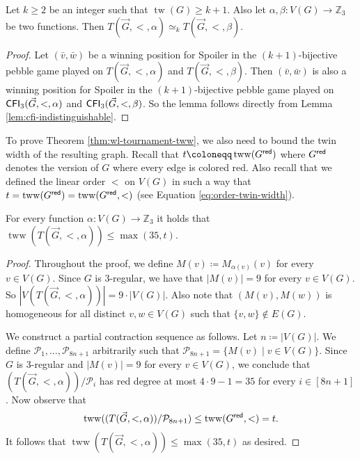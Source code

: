 \documentclass{theoretics}
\newcommand{\CP}{{\mathcal P}}
\newcommand{\ZZ}{{\mathbb Z}}
\newcommand{\red}{{\sf red}}
\DeclareMathOperator{\tw}{tw}
\DeclareMathOperator{\tww}{tww}
\newcommand{\CFI}{{\sf CFI}}
\begin{document}
\begin{lemma}
 \label{lem:cfi-tournament-indistinguishable}
 Let $k \geq 2$ be an integer such that $\tw(G) \geq k+1$.
 Also let $\alpha,\beta\colon V(G) \to \ZZ_3$ be two functions.
 Then $T(\vec{G},<,\alpha) \simeq_k T(\vec{G},<,\beta)$.
\end{lemma}

\begin{proof}
 Let $(\bar v,\bar w)$ be a winning position for Spoiler in the $(k+1)$-bijective pebble game played on $T(\vec{G},<,\alpha)$ and $T(\vec{G},<,\beta)$.
 Then $(\bar v,\bar w)$ is also a winning position for Spoiler in the $(k+1)$-bijective pebble game played on $\CFI_3(\vec{G},<,\alpha)$ and $\CFI_3(\vec{G},<,\beta)$.
 So the lemma follows directly from Lemma \ref{lem:cfi-indistinguishable}.
\end{proof}

To prove Theorem \ref{thm:wl-tournament-tww}, we also need to bound the twin width of the resulting graph.
Recall that $t \coloneqq \tww(G^{\red})$ where $G^{\red}$ denotes the version of $G$ where every edge is colored red.
Also recall that we defined the linear order $<$ on $V(G)$ in such a way that $t = \tww(G^{\red}) = \tww(G^{\red},<)$ (see Equation \eqref{eq:order-twin-width}).

\begin{lemma}
 \label{lem:tww-cfi-tournament}
 For every function $\alpha\colon V(G) \to \ZZ_3$ it holds that $\tww(T(\vec{G},<,\alpha)) \leq \max(35,t)$.
\end{lemma}

\begin{proof}
 Throughout the proof, we define $M(v) \coloneqq M_{\alpha(v)}(v)$ for every $v \in V(G)$.
 Since $G$ is $3$-regular, we have that $|M(v)| = 9$ for every $v \in V(G)$.
 So $|V(T(\vec{G},<,\alpha))| = 9 \cdot |V(G)|$.
 Also note that $(M(v),M(w))$ is homogeneous for all distinct $v,w \in V(G)$ such that $\{v,w\} \notin E(G)$.

 We construct a partial contraction sequence as follows.
 Let $n \coloneqq |V(G)|$.
 We define $\CP_1,\dots,\CP_{8n+1}$ arbitrarily such that $\CP_{8n+1} = \{M(v) \mid v \in V(G)\}$.
 Since $G$ is $3$-regular and $|M(v)| = 9$ for every $v \in V(G)$, we conclude that $(T(\vec{G},<,\alpha))/\CP_i$ has red degree at most $4 \cdot 9 - 1 = 35$ for every $i \in [8n+1]$.
 Now observe that
 \[\tww((T(\vec{G},<,\alpha))/\CP_{8n+1}) \leq \tww(G^{\red},<) = t.\]
 It follows that $\tww(T(\vec{G},<,\alpha)) \leq \max(35,t)$ as desired.
\end{proof}
\end{document}
